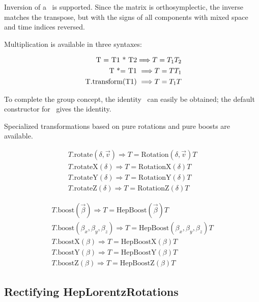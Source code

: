 Inversion of a \LT\ is supported.  Since the matrix is orthosymplectic,
the inverse matches the transpose, but with the signs of all components
with mixed space and time indices reversed.

Multiplication is available in three syntaxes:

\begin{eqnarray}
	\mbox{ T = T1 * T2} \Longrightarrow {\boldmath T = T_1 T_2}
	\\
	\mbox{ T *= T1 } \Longrightarrow {\boldmath T = T T_1 }
	\\
\label{eq:lttrans}
	\mbox{ T.transform(T1) } \Longrightarrow {\boldmath T = T_1 T }
\end{eqnarray}

To complete the group concept, the identity \LT\ can easily be obtained; the
default constructor for \LT\ gives the identity.

Specialized transformations based on pure rotations and pure boosts 
are available.  

\begin{eqnarray}
\label{eq:ltrot}
  T\mbox{.rotate}(\delta, \vec{v}) \Longrightarrow T = 
		\mbox{Rotation}(\delta, \vec{v}) T \\
\nonumber
  T\mbox{.rotateX}(\delta) \Longrightarrow T = \mbox{RotationX}(\delta) T \\
\nonumber
  T\mbox{.rotateY}(\delta) \Longrightarrow T = \mbox{RotationY}(\delta) T \\
\nonumber
  T\mbox{.rotateZ}(\delta) \Longrightarrow T = \mbox{RotationZ}(\delta) T 
\end{eqnarray}

\begin{eqnarray}
\label{eq:ltboost}
  T\mbox{.boost}(\vec{\beta}) \Longrightarrow T = 
		\mbox{HepBoost}(\vec{\beta}) T \\
\nonumber
  T\mbox{.boost}(\beta_x, \beta_y, \beta_z) \Longrightarrow T = 
		\mbox{HepBoost}(\beta_x, \beta_y, \beta_z) T \\
\nonumber
  T\mbox{.boostX}(\beta) \Longrightarrow T = \mbox{HepBoostX}(\beta) T \\
\nonumber
  T\mbox{.boostY}(\beta) \Longrightarrow T = \mbox{HepBoostY}(\beta) T \\
\nonumber
  T\mbox{.boostZ}(\beta) \Longrightarrow T = \mbox{HepBoostZ}(\beta) T 
\end{eqnarray}


\subsection{Rectifying HepLorentzRotations}

